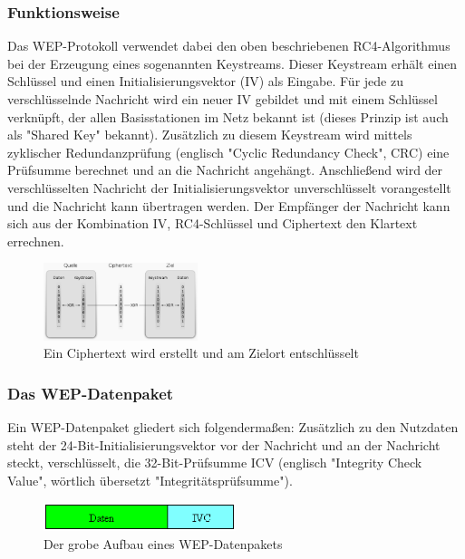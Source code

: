 \documentclass[a4paper,13pt]{scrartcl}
\begin{document}
\subsubsection{Funktionsweise}
Das WEP-Protokoll verwendet dabei den oben beschriebenen RC4-Algorithmus bei der Erzeugung eines sogenannten Keystreams. Dieser Keystream erhält einen Schlüssel und einen Initialisierungsvektor (IV) als Eingabe. Für jede zu verschlüsselnde Nachricht wird ein neuer IV gebildet und mit einem Schlüssel verknüpft, der allen Basisstationen im Netz bekannt ist (dieses Prinzip ist auch als "Shared Key" bekannt). Zusätzlich zu diesem Keystream wird mittels zyklischer Redundanzprüfung (englisch "Cyclic Redundancy Check", CRC) eine Prüfsumme berechnet und an die Nachricht angehängt. Anschließend wird der verschlüsselten Nachricht der Initialisierungsvektor unverschlüsselt vorangestellt und die Nachricht kann übertragen werden. Der Empfänger der Nachricht kann sich aus der Kombination IV, RC4-Schlüssel und Ciphertext den Klartext errechnen.
\begin{figure}[ht]
		\centering
	\includegraphics[width=0.4\textwidth]{WEP.eps}
		\caption{Ein Ciphertext wird erstellt und am Zielort entschlüsselt}
		\label{fig2}
\end{figure}
\subsubsection{Das WEP-Datenpaket}
Ein WEP-Datenpaket gliedert sich folgendermaßen: Zusätzlich zu den Nutzdaten steht der 24-Bit-Initialisierungsvektor vor der Nachricht und an der Nachricht steckt, verschlüsselt, die 32-Bit-Prüfsumme ICV (englisch "Integrity Check Value", wörtlich übersetzt "Integritätsprüfsumme").
\begin{figure}[ht]
		\centering
	\includegraphics[width=0.5\textwidth]{WEP_DPaket.eps}
		\caption{Der grobe Aufbau eines WEP-Datenpakets}
		\label{fig3}
\end{figure}
\end{document}

